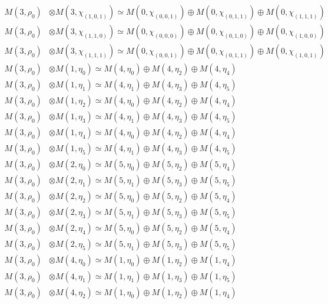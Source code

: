 \begin{align*}
M(3,\rho_{0}) &\otimes M(3,\chi_{(1,0,1)}) \simeq M(0,\chi_{(0,0,1)}) \oplus M(0,\chi_{(0,1,1)}) \oplus M(0,\chi_{(1,1,1)}) \\
M(3,\rho_{0}) &\otimes M(3,\chi_{(1,1,0)}) \simeq M(0,\chi_{(0,0,0)}) \oplus M(0,\chi_{(0,1,0)}) \oplus M(0,\chi_{(1,0,0)}) \\
M(3,\rho_{0}) &\otimes M(3,\chi_{(1,1,1)}) \simeq M(0,\chi_{(0,0,1)}) \oplus M(0,\chi_{(0,1,1)}) \oplus M(0,\chi_{(1,0,1)}) \\
M(3,\rho_{0}) &\otimes M(1,\eta_{0}) \simeq M(4,\eta_{0}) \oplus M(4,\eta_{2}) \oplus M(4,\eta_{4}) \\
M(3,\rho_{0}) &\otimes M(1,\eta_{1}) \simeq M(4,\eta_{1}) \oplus M(4,\eta_{3}) \oplus M(4,\eta_{5}) \\
M(3,\rho_{0}) &\otimes M(1,\eta_{2}) \simeq M(4,\eta_{0}) \oplus M(4,\eta_{2}) \oplus M(4,\eta_{4}) \\
M(3,\rho_{0}) &\otimes M(1,\eta_{3}) \simeq M(4,\eta_{1}) \oplus M(4,\eta_{3}) \oplus M(4,\eta_{5}) \\
M(3,\rho_{0}) &\otimes M(1,\eta_{4}) \simeq M(4,\eta_{0}) \oplus M(4,\eta_{2}) \oplus M(4,\eta_{4}) \\
M(3,\rho_{0}) &\otimes M(1,\eta_{5}) \simeq M(4,\eta_{1}) \oplus M(4,\eta_{3}) \oplus M(4,\eta_{5}) \\
M(3,\rho_{0}) &\otimes M(2,\eta_{0}) \simeq M(5,\eta_{0}) \oplus M(5,\eta_{2}) \oplus M(5,\eta_{4}) \\
M(3,\rho_{0}) &\otimes M(2,\eta_{1}) \simeq M(5,\eta_{1}) \oplus M(5,\eta_{3}) \oplus M(5,\eta_{5}) \\
M(3,\rho_{0}) &\otimes M(2,\eta_{2}) \simeq M(5,\eta_{0}) \oplus M(5,\eta_{2}) \oplus M(5,\eta_{4}) \\
M(3,\rho_{0}) &\otimes M(2,\eta_{3}) \simeq M(5,\eta_{1}) \oplus M(5,\eta_{3}) \oplus M(5,\eta_{5}) \\
M(3,\rho_{0}) &\otimes M(2,\eta_{4}) \simeq M(5,\eta_{0}) \oplus M(5,\eta_{2}) \oplus M(5,\eta_{4}) \\
M(3,\rho_{0}) &\otimes M(2,\eta_{5}) \simeq M(5,\eta_{1}) \oplus M(5,\eta_{3}) \oplus M(5,\eta_{5}) \\
M(3,\rho_{0}) &\otimes M(4,\eta_{0}) \simeq M(1,\eta_{0}) \oplus M(1,\eta_{2}) \oplus M(1,\eta_{4}) \\
M(3,\rho_{0}) &\otimes M(4,\eta_{1}) \simeq M(1,\eta_{1}) \oplus M(1,\eta_{3}) \oplus M(1,\eta_{5}) \\
M(3,\rho_{0}) &\otimes M(4,\eta_{2}) \simeq M(1,\eta_{0}) \oplus M(1,\eta_{2}) \oplus M(1,\eta_{4}) \\

\end{align*}
